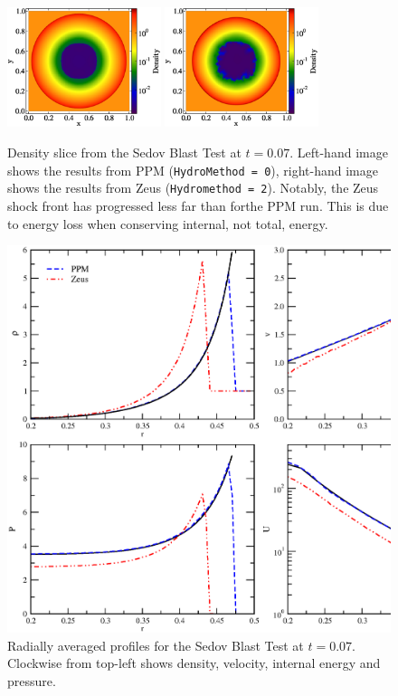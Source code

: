 \begin{figure}
\begin{center}
\includegraphics[width=0.4\textwidth]{figures/sedov-ppm-slice.eps}
\includegraphics[width=0.4\textwidth]{figures/sedov-zeus-slice.eps}
\caption{Density slice from the Sedov Blast Test at $t = 0.07$. Left-hand image shows the results from PPM ({\tt HydroMethod = 0}), right-hand image shows the results from Zeus ({\tt Hydromethod = 2}). Notably, the Zeus shock front has progressed less far than forthe PPM run. This is due to energy loss when conserving internal, not total, energy.}
\label{fig.sedov1}
\end{center}
\end{figure}


\begin{figure}
\begin{center}
\includegraphics[width=\textwidth]{figures/sedov-profiles.eps}
\caption{Radially averaged profiles for the Sedov Blast Test at $t = 0.07$. Clockwise from top-left shows density, velocity, internal energy and pressure.}
\label{fig.sedov2}
\end{center}
\end{figure}

